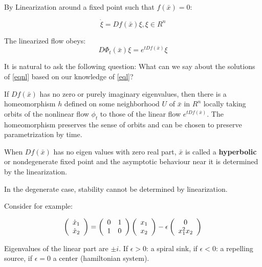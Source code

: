 \documentclass[12pt]{book}
\begin{document}
By Linearization around a fixed point such that $f(\bar x)=0$:



\begin{equation}\label{eql}
\dot \xi=Df(\bar x)\xi, \xi\in R^n
\end{equation}

The linearized flow obeys:
\begin{equation}
D\Phi_t(\bar x)\xi=e^{tDf(\bar x)}\xi
\end{equation}



It is natural to ask the following question:
What can we say about the solutions of \ref{eqnl} based on our
knowledge of \ref{eql}?

\begin{thm}
If $Df(\bar x)$ has no zero or purely imaginary eigenvalues, then
there is a homeomorphism $h$ defined on some neighborhood $U$ of $\bar
x$ in $R^n$ locally taking orbits of the nonlinear flow $\phi_t$ to
those of the linear flow $e^{tDf(\bar x)}$. The homeomorphism
preserves the sense of orbits and can be chosen to preserve
parametrization by time.
\end{thm}

When $Df(\bar x)$ has no eigen values with zero real part, $\bar x$ is
called a {\bf hyperbolic} or nondegenerate fixed point and the asymptotic
behaviour near it is determined by the linearization.

In the degenerate case, stability cannot be determined by
linearization.

Consider for example:

\begin{equation}
\left( \begin{array}{c}
\dot x_1\cr \dot x_2
\end{array} \right)
=
\left( \begin{array}{cc}
0&1\cr 
1&0
\end{array} \right)
\left( \begin{array}{c}
x_1\cr x_2
\end{array} \right)
-
\epsilon
\left( \begin{array}{c}
0\cr
x_1^2x_2
\end{array} \right)
\end{equation}

Eigenvalues of the linear part are $\pm i$.
If $\epsilon>0$: a spiral sink, if  $\epsilon<0$: a repelling source,
if $\epsilon=0$ a center (hamiltonian system).
\end{document}

